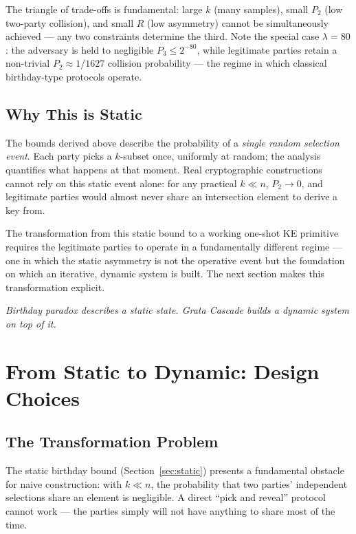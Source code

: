 \documentclass[11pt,a4paper]{article}
\begin{document}
The triangle of trade-offs is fundamental: large $k$ (many samples), small $P_2$ (low two-party collision), and small $R$ (low asymmetry) cannot be simultaneously achieved --- any two constraints determine the third. Note the special case $\lambda = 80$: the adversary is held to negligible $P_3 \leq 2^{-80}$, while legitimate parties retain a non-trivial $P_2 \approx 1/1627$ collision probability --- the regime in which classical birthday-type protocols operate.

\subsection{Why This is Static}\label{sec:why-static}

The bounds derived above describe the probability of a \emph{single random selection event}. Each party picks a $k$-subset once, uniformly at random; the analysis quantifies what happens at that moment. Real cryptographic constructions cannot rely on this static event alone: for any practical $k \ll n$, $P_2 \to 0$, and legitimate parties would almost never share an intersection element to derive a key from.

The transformation from this static bound to a working one-shot KE primitive requires the legitimate parties to operate in a fundamentally different regime --- one in which the static asymmetry is not the operative event but the foundation on which an iterative, dynamic system is built. The next section makes this transformation explicit.

\medskip
\noindent\textit{Birthday paradox describes a static state. Grata Cascade builds a dynamic system on top of it.}

\section{From Static to Dynamic: Design Choices}\label{sec:transformation}

\subsection{The Transformation Problem}

The static birthday bound (Section~\ref{sec:static}) presents a fundamental obstacle for naive construction: with $k \ll n$, the probability that two parties' independent selections share an element is negligible. A direct ``pick and reveal'' protocol cannot work --- the parties simply will not have anything to share most of the time.
\end{document}
